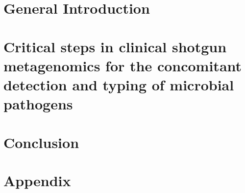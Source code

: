 \documentclass[12pt,a4paper,twoside,openright]{book}
\begin{document}
\begin{sloppy}
\newpage
\thispagestyle{empty}
\chapter{General Introduction\label{ch:introduction}}
\thispagestyle{empty}
\clearpage \thispagestyle{empty}\mbox{}\clearpage
\newpage
\begin{refsection}

\newpage
\printbibliography
\end{refsection}


\newpage
\thispagestyle{empty}
\chapter{Critical steps in clinical shotgun metagenomics for the concomitant detection and typing of microbial pathogens\label{ch:paper1}}

\thispagestyle{empty}
\clearpage \thispagestyle{empty}\mbox{}\clearpage
\newpage
\begin{refsection}

\newpage
\printbibliography
\end{refsection}

\newpage
\chapter{Conclusion \label{ch:conclusion}}
\thispagestyle{empty}
\newpage


\appendix
\chapter{Appendix}

%
%
%

\end{sloppy}
\end{document}
